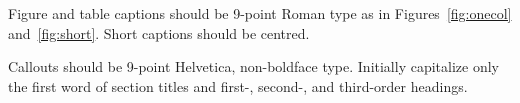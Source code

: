 \documentclass[10pt,twocolumn,letterpaper]{article}
\begin{document}
Figure and table captions should be 9-point Roman type as in
Figures~\ref{fig:onecol} and~\ref{fig:short}.  Short captions should be centred.

\noindent Callouts should be 9-point Helvetica, non-boldface type.
Initially capitalize only the first word of section titles and first-,
second-, and third-order headings.


{\small


}
\end{document}
